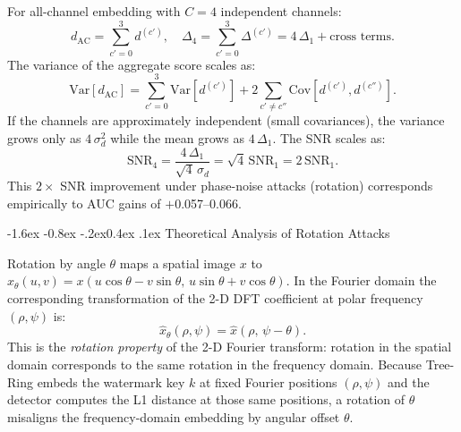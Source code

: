 \documentclass[10pt,twocolumn]{article}
\makeatletter
\renewcommand\subsection{\@startsection{subsection}{2}{\z@}%
  {-1.6ex \@plus -0.8ex \@minus -.2ex}{0.4ex \@plus .1ex}%
  {\normalfont\normalsize\itshape}}
\makeatother
\begin{document}
For all-channel embedding with $C{=}4$ independent channels:
\begin{equation}
  d_{\mathrm{AC}} = \sum_{c'=0}^{3} d^{(c')},
  \quad
  \Delta_4 = \sum_{c'=0}^{3} \Delta^{(c')} = 4\,\Delta_1 + \text{cross terms}.
\end{equation}
The variance of the aggregate score scales as:
\begin{equation}
  \mathrm{Var}[d_{\mathrm{AC}}]
    = \sum_{c'=0}^{3} \mathrm{Var}[d^{(c')}]
    + 2\sum_{c' \ne c''} \mathrm{Cov}[d^{(c')}, d^{(c'')}].
\end{equation}
If the channels are approximately independent (small covariances),
the variance grows only as $4\,\sigma_d^2$ while the mean grows
as $4\,\Delta_1$.
The SNR scales as:
\begin{equation}
  \mathrm{SNR}_4
    = \frac{4\,\Delta_1}{\sqrt{4}\,\sigma_d}
    = \sqrt{4}\,\mathrm{SNR}_1
    = 2\,\mathrm{SNR}_1.
  \label{eq:snr4}
\end{equation}
This $2\times$ SNR improvement under phase-noise attacks (rotation)
corresponds empirically to AUC gains of $+$0.057--0.066.

\subsection{Theoretical Analysis of Rotation Attacks}
\label{sec:theory_rotation}

Rotation by angle $\theta$ maps a spatial image $x$ to
$x_\theta(u,v) = x(u\cos\theta - v\sin\theta,\, u\sin\theta + v\cos\theta)$.
In the Fourier domain the corresponding transformation of the 2-D
DFT coefficient at polar frequency $(\rho, \psi)$ is:
\begin{equation}
  \hat{x}_\theta(\rho, \psi) = \hat{x}(\rho,\, \psi - \theta).
\end{equation}
This is the \emph{rotation property} of the 2-D Fourier transform:
rotation in the spatial domain corresponds to the same rotation in the
frequency domain.
Because Tree-Ring embeds the watermark key $k$ at fixed Fourier
positions $(\rho, \psi)$ and the detector computes the L1 distance
at those same positions, a rotation of $\theta$ misaligns the
frequency-domain embedding by angular offset $\theta$.
\end{document}
